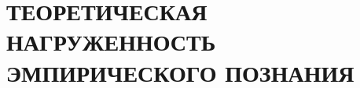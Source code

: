 \section[Теоретическая нагруженность эмпирического познания]{%
    ТЕОРЕТИЧЕСКАЯ НАГРУЖЕННОСТЬ ЭМПИРИЧЕСКОГО ПОЗНАНИЯ
}

\pagebreak